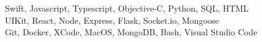    Swift, Javascript, Typescript, Objective-C, Python, SQL, HTML \\
   UIKit, React, Node, Express, Flask, Socket.io, Mongoose\\
  Git, Docker, XCode, MacOS, MongoDB, Bash, Visual Studio Code
